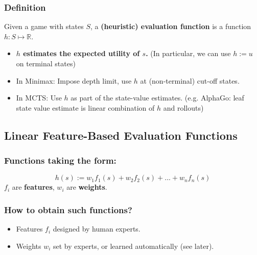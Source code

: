 \documentclass[conference, a4paper]{styles/acmsiggraph}
\begin{document}
        \subsubsection{Definition}
            Given a game with states $S$, a \textbf{(heuristic) evaluation function} is a function $h : S \mapsto \mathbb{R}$.
                \begin{itemize}
                    \item \textbf{$h$ estimates the expected utility of $s$.}
                        (In particular, we can use $h := u$ on terminal states)
                    \item In Minimax: Impose depth limit, use $h$ at (non-terminal) cut-off states.
                    \item In MCTS: Use $h$ as part of the state-value estimates. 
                        (e.g. AlphaGo: leaf state value estimate is linear combination of $h$ and rollouts)
                \end{itemize}
        
    \subsection{Linear Feature-Based Evaluation Functions}
        \subsubsection{Functions taking the form:}
            $$h(s) := w_1f_1(s) + w_2f_2(s) + ... + w_nf_n(s)$$
            $f_i$ are \textbf{features}, $w_i$ are \textbf{weights}.
        
        \subsubsection{How to obtain such functions?}
            \begin{itemize}
                \item Features $f_i$ designed by human experts.
                \item Weights $w_i$ set by experts, or learned automatically (see later).
            \end{itemize}
    
\end{document}

